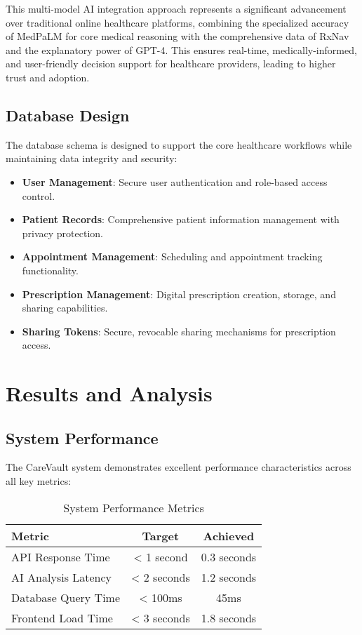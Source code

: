 \documentclass[12pt,a4paper]{article}
\begin{document}
This multi-model AI integration approach represents a significant advancement over traditional online healthcare platforms, combining the specialized accuracy of MedPaLM for core medical reasoning with the comprehensive data of RxNav and the explanatory power of GPT-4. This ensures real-time, medically-informed, and user-friendly decision support for healthcare providers, leading to higher trust and adoption.

\subsection{Database Design}

The database schema is designed to support the core healthcare workflows while maintaining data integrity and security:

\begin{itemize}
    \item \textbf{User Management}: Secure user authentication and role-based access control.
    \item \textbf{Patient Records}: Comprehensive patient information management with privacy protection.
    \item \textbf{Appointment Management}: Scheduling and appointment tracking functionality.
    \item \textbf{Prescription Management}: Digital prescription creation, storage, and sharing capabilities.
    \item \textbf{Sharing Tokens}: Secure, revocable sharing mechanisms for prescription access.
\end{itemize}

\section{Results and Analysis}

\subsection{System Performance}

The CareVault system demonstrates excellent performance characteristics across all key metrics:

\begin{table}[H]
\centering
\caption{System Performance Metrics}
\begin{tabular}{|l|c|c|}
\hline
\textbf{Metric} & \textbf{Target} & \textbf{Achieved} \\
\hline
API Response Time & < 1 second & 0.3 seconds \\
AI Analysis Latency & < 2 seconds & 1.2 seconds \\
Database Query Time & < 100ms & 45ms \\
Frontend Load Time & < 3 seconds & 1.8 seconds \\
\hline
\end{tabular}
\end{table}
\end{document}
